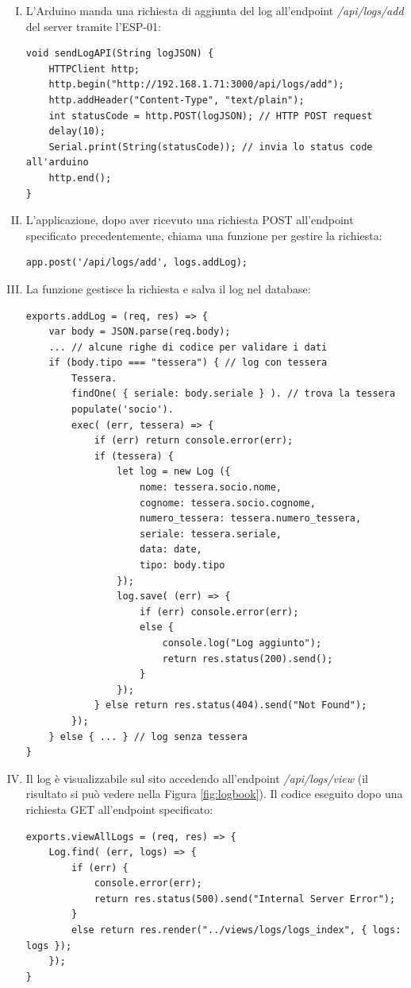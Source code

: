 \documentclass[12pt]{report}
\begin{document}
\begin{enumerate}[(I)]
	\item L'Arduino manda una richiesta di aggiunta del log all'endpoint \emph{/api/logs/add} del server tramite l'ESP-01:
\begin{lstlisting}
void sendLogAPI(String logJSON) {
	HTTPClient http;
	http.begin("http://192.168.1.71:3000/api/logs/add");
	http.addHeader("Content-Type", "text/plain");
	int statusCode = http.POST(logJSON); // HTTP POST request
	delay(10);
	Serial.print(String(statusCode)); // invia lo status code all'arduino
	http.end();
}
\end{lstlisting}
	\item L'applicazione, dopo aver ricevuto una richiesta POST all'endpoint specificato precedentemente, chiama una funzione per gestire la richiesta:
\begin{lstlisting}
app.post('/api/logs/add', logs.addLog);
\end{lstlisting}
	\item La funzione gestisce la richiesta e salva il log nel database:
\begin{lstlisting}
exports.addLog = (req, res) => {
	var body = JSON.parse(req.body);
	... // alcune righe di codice per validare i dati
	if (body.tipo === "tessera") { // log con tessera 
		Tessera.
		findOne( { seriale: body.seriale } ). // trova la tessera 
		populate('socio').
		exec( (err, tessera) => {
			if (err) return console.error(err);
			if (tessera) {
				let log = new Log ({
					nome: tessera.socio.nome,
					cognome: tessera.socio.cognome,
					numero_tessera: tessera.numero_tessera,
					seriale: tessera.seriale,
					data: date,
					tipo: body.tipo
				});	
				log.save( (err) => {
					if (err) console.error(err);
					else {
						console.log("Log aggiunto");
						return res.status(200).send();
					}
				});
			} else return res.status(404).send("Not Found");
		});
	} else { ... } // log senza tessera
}
\end{lstlisting}
\item Il log è visualizzabile sul sito accedendo all'endpoint \emph{/api/logs/view} (il risultato si può vedere nella Figura \ref{fig:logbook})$.$ Il codice eseguito dopo una richiesta GET all'endpoint specificato:
\begin{lstlisting}
exports.viewAllLogs = (req, res) => {
	Log.find( (err, logs) => {
		if (err) {
			console.error(err);
			return res.status(500).send("Internal Server Error");
		}
		else return res.render("../views/logs/logs_index", { logs: logs });
	});
}
\end{lstlisting}
\end{enumerate}
\end{document}
